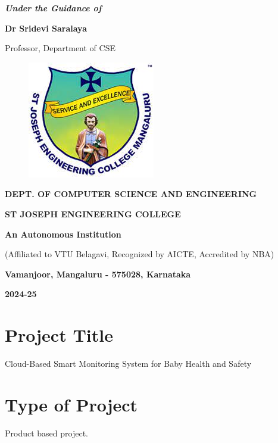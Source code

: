 \documentclass[12pt,a4paper]{report}
\begin{document}
\begin{center}
\vspace{12pt}
\textit{\textbf{Under the Guidance of}}
\par
\vspace{6pt}
\textbf{Dr Sridevi Saralaya}
\par
\vspace{2pt}
\normalsize { Professor, Department of CSE }
\par
\begin{figure}[hbtp]
\centering
\includegraphics[scale=0.6]{./pic/sjeclogo}
\end{figure}
\large \textbf{DEPT. OF COMPUTER SCIENCE AND ENGINEERING}
\par \Large \textbf{ST JOSEPH ENGINEERING COLLEGE}
\par 
\textbf{An Autonomous Institution}
\par
{\large{(Affiliated to VTU Belagavi, Recognized by AICTE, Accredited by NBA)}}
\par
\vspace{3pt}
{\large \textbf{Vamanjoor, Mangaluru - 575028, Karnataka}}
\par 
\vspace{12pt}
{\Large \textbf{2024-25}}
\end{center}
\newpage

\pagestyle{plain}

\section*{Project Title}
Cloud-Based Smart Monitoring System for Baby Health and Safety

\section*{Type of Project}
Product based project.
\end{document}
